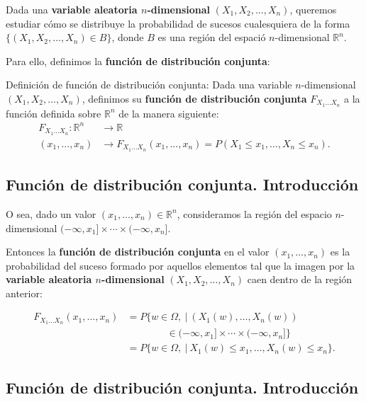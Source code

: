 \documentclass[]{book}
\begin{document}
Dada una \textbf{variable aleatoria \(n\)-dimensional} \((X_1,X_2,\ldots,X_n)\), queremos estudiar cómo se distribuye la probabilidad de sucesos cualesquiera de la forma \(\{(X_1,X_2,\ldots,X_n)\in B\}\), donde \(B\) es una región del espació \(n\)-dimensional \(\mathbb{R}^n\).

Para ello, definimos la \textbf{función de distribución conjunta}:

Definición de función de distribución conjunta:
Dada una variable \(n\)-dimensional \((X_1,X_2,\ldots,X_n)\), definimos su \textbf{función de distribución conjunta} \(F_{X_1\ldots X_n}\) a la función definida sobre \(\mathbb{R}^n\) de la manera siguiente:
\[
\begin{array}{rl}
F_{X_1\ldots X_n}: \mathbb{R}^n & \longrightarrow \mathbb{R}\\
(x_1,\ldots,x_n) & \longrightarrow F_{X_1\ldots X_n}(x_1,\ldots,x_n)=P(X_1\leq x_1,\ldots,X_n\leq x_n).
\end{array}
\]

\hypertarget{funciuxf3n-de-distribuciuxf3n-conjunta.-introducciuxf3n-4}{%
\subsection{Función de distribución conjunta. Introducción}\label{funciuxf3n-de-distribuciuxf3n-conjunta.-introducciuxf3n-4}}

O sea, dado un valor \((x_1,\ldots,x_n)\in \mathbb{R}^n\), consideramos la región del espacio \(n\)-dimensional \((-\infty,x_1]\times\cdots\times (-\infty,x_n]\).

Entonces la \textbf{función de distribución conjunta} en el valor \((x_1,\ldots,x_n)\) es la probabilidad del suceso formado por aquellos elementos tal que la imagen por la \textbf{variable aleatoria \(n\)-dimensional} \((X_1,X_2,\ldots,X_n)\) caen dentro de la región anterior:

\[
\begin{array}{rl}
F_{X_1\ldots X_n}(x_1,\ldots,x_n) & =P\{w\in\Omega,\ |\ (X_1(w),\ldots,X_n(w)) \\ & \qquad\qquad\in (-\infty,x_1]\times\cdots\times (-\infty,x_n]\} \\ & = P\{w\in\Omega,\ |\ X_1(w)\leq x_1,\ldots, X_n(w)\leq x_n\}.
\end{array}
\]

\hypertarget{funciuxf3n-de-distribuciuxf3n-conjunta.-introducciuxf3n-5}{%
\subsection{Función de distribución conjunta. Introducción}\label{funciuxf3n-de-distribuciuxf3n-conjunta.-introducciuxf3n-5}}
\end{document}
